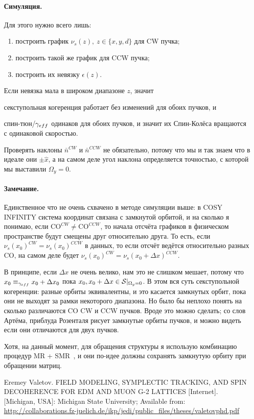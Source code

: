 \documentclass[a4paper,14pt]{article}
\newcommand{\W}{\Omega}
\newcommand{\nbar}{\bar n}
\newcommand{\CO}{\mathrm{CO}}
\begin{document}
\paragraph{Симуляция.}
Для этого нужно всего лишь:
\begin{enumerate}
\item построить график $\nu_s(z),~z\in\{x,y,d\}$ для CW пучка;
\item построить такой же график для CCW пучка;
\item построить их невязку $\epsilon(z)$.
\end{enumerate}

Если невязка мала в широком диапазоне $z$, значит
\begin{inparaenum}[1)]
\item секступольная когеренция работает без изменений для обоих пучков, и
\item спин-тюн/$\g*$ одинаков для обоих пучков, и значит их Спин-Колёса вращаются с одинаковой скоростью.
\end{inparaenum}

Проверять наклоны $\nbar^{CW}$ и $\nbar^{CCW}$ не обязательно, потому что мы и так знаем что
в идеале они $\pm\hat x$, а на самом деле угол наклона определяется точностью, с которой мы выставили $\W_y=0$.

\paragraph{Замечание.}
Единственное что не очень схвачено в методе симуляции выше: в COSY INFINITY система координат связана с
замкнутой орбитой, и на сколько я понимаю, если $\CO^{CW}\neq \CO^{CCW}$, то начала отсчёта графиков в
физическом пространстве будут смещены друг относительно друга. То есть, если $\nu_s(x_0)^{CW} = \nu_s(x_0)^{CCW}$
в данных, то если отсчёт ведётся относительно разных $\CO$, на самом деле будет
$\nu_s(x_0)^{CW} = \nu_s(x_0+\Delta x)^{CCW}$.

В принципе, если $\Delta x$ не очень велико, нам это не слишком мешает, потому что
$x_0\equiv_{\g*} x_0+\Delta x_0$ пока $x_0, x_0+\Delta x \in \Stab*$. В этом вся суть
секступольной когеренции: разные орбиты эквивалентны, и это касается замкнутых орбит, пока они не выходят
за рамки некоторого диапазона. Но было бы неплохо понять
на сколько различаются $\CO$ CW и CCW пучков. Вроде это можно сделать; со слов Артёма, приблуда Розенталя рисует
замкнутые орбиты пучков, и можно видеть если они отличаются для двух пучков.

Хотя, на данный момент, для обращения структуры я использую комбинацию процедур
MR + SMR~\cite[стр.~233]{Eremey:Thesis}, и они по-идее должны сохранять замкнутую орбиту при обращении матриц.

\begin{thebibliography}{9}
  Eremey Valetov. FIELD MODELING, SYMPLECTIC TRACKING, AND SPIN DECOHERENCE FOR EDM AND MUON G-2 LATTICES [Internet]. [Michigan, USA]: Michigan State University; Available from: \url{http://collaborations.fz-juelich.de/ikp/jedi/public_files/theses/valetovphd.pdf}
\end{thebibliography}
\end{document}
